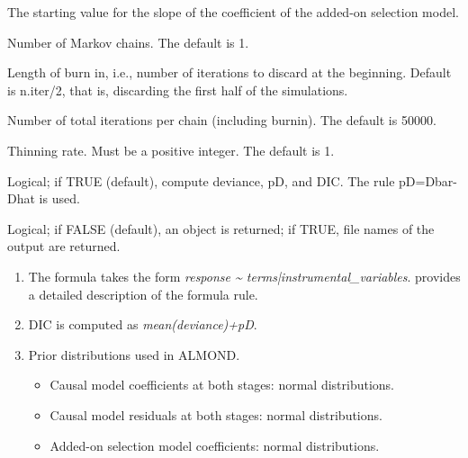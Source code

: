 \documentclass[a4paper]{book}
\begin{document}
\begin{Arguments}
\begin{ldescription}
\item[\code{lambda1.start}] The starting value for the slope of the coefficient of the added-on selection model.

\item[\code{n.chains}] Number of Markov chains. The default is 1.

\item[\code{n.burnin}] Length of burn in, i.e., number of iterations to discard at the beginning.
Default is n.iter/2, that is, discarding the first half of the simulations.

\item[\code{n.iter}] Number of total iterations per chain (including burnin). The default is 50000.

\item[\code{n.thin}] Thinning rate. Must be a positive integer. The default is 1.

\item[\code{DIC}] Logical; if TRUE (default), compute deviance, pD, and DIC. The rule pD=Dbar-Dhat is used.

\item[\code{codaPkg}] Logical; if FALSE (default), an object is returned; if TRUE,
file names of the output are returned.
\end{ldescription}
\end{Arguments}
%
\begin{Details}\relax
\begin{enumerate}

\item The formula takes the form \emph{response \textasciitilde{} terms|instrumental\_variables}.
 provides a detailed description of the formula rule.
\item DIC is computed as \emph{mean(deviance)+pD}.
\item Prior distributions used in ALMOND.
\begin{itemize}

\item Causal model coefficients at both stages: normal distributions.
\item Causal model residuals at both stages: normal distributions.
\item Added-on selection model coefficients: normal distributions.

\end{itemize}


\end{enumerate}

\end{Details}
\end{document}
